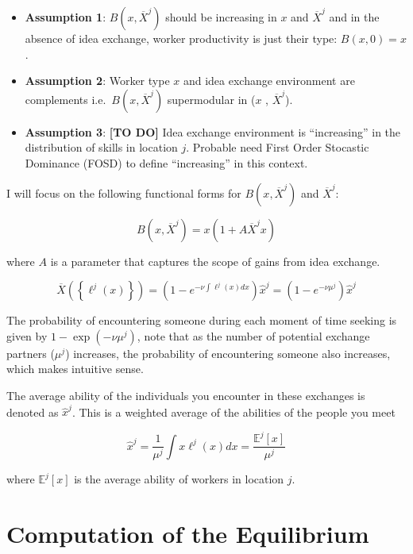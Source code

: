 \documentclass[
  letterpaper,
  DIV=11,
  numbers=noendperiod]{scrreprt}
\providecommand{\tightlist}{%
  \setlength{\itemsep}{0pt}\setlength{\parskip}{0pt}}\usepackage{longtable,booktabs,array}
\begin{document}
\begin{itemize}
\tightlist
\item
  \textbf{Assumption 1}: \(B(x, \overline{X}^j)\) should be increasing
  in \(x\) and \(\overline{X}^j\) and in the absence of idea exchange,
  worker productivity is just their type: \(B(x, 0) = x\).
\item
  \textbf{Assumption 2}: Worker type \(x\) and idea exchange environment
  are complements i.e.~\(B(x, \overline{X}^j)\) supermodular in (\(x\) ,
  \(\overline{X}^j\)).
\item
  \textbf{Assumption 3}: {\textbf{{[}TO DO{]}}} Idea exchange
  environment is ``increasing'' in the distribution of skills in
  location \(j\). Probable need First Order Stocastic Dominance (FOSD)
  to define ``increasing'' in this context.
\end{itemize}

I will focus on the following functional forms for
\(B(x, \overline{X}^j)\) and \(\overline{X}^j\):

\begin{equation}
    B(x, \overline{X}^j) = x(1 + A \overline{X}^j x)
\end{equation}

where \(A\) is a parameter that captures the scope of gains from idea
exchange.

\begin{equation}
    \overline{X}\left(\left\{\ell^j(x)\right\}\right) = \left(1 - e^{-\nu \int \ell^j(x) dx}\right)\hat{x}^j =\left(1 - e^{-\nu \mu^j} \right)\hat{x}^j
\end{equation}

The probability of encountering someone during each moment of time
seeking is given by \(1 - \exp(-ν \mu^j)\), note that as the number of
potential exchange partners (\(\mu^j\)) increases, the probability of
encountering someone also increases, which makes intuitive sense.

The average ability of the individuals you encounter in these exchanges
is denoted as \(\hat{x}^j\). This is a weighted average of the abilities
of the people you meet

\[\hat{x}^j = \frac{1}{\mu^j}\int{x\ell^j(x)dx}=\frac{\mathbb{E}^j[x]}{\mu^j}\]

where \(\mathbb{E}^j[x]\) is the average ability of workers in location
\(j\).


\hypertarget{computation-of-the-equilibrium}{%
\chapter{Computation of the
Equilibrium}\label{computation-of-the-equilibrium}}
\end{document}
